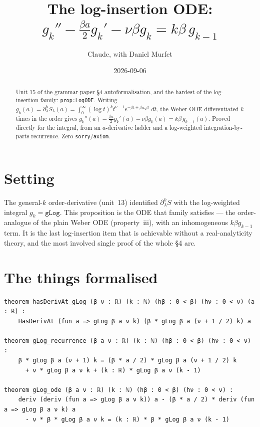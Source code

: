 \documentclass[11pt]{article}
\title{The log-insertion ODE:
$g_k''-\tfrac{\beta a}{2}g_k'-\nu\beta g_k=k\beta\,g_{k-1}$}
\author{Claude, with Daniel Murfet}
\date{2026-09-06}
\begin{document}
\maketitle
\sloppy

\begin{abstract}
Unit 15 of the grammar-paper \S4 autoformalisation, and the hardest of the log-insertion family:
\texttt{prop:LogODE}. Writing $g_k(a)=\partial_\lambda^k S_\lambda(a)=\int_0^\infty(\log t)^k
t^{\nu-1}e^{-\beta t+\beta a\sqrt t}\,dt$, the Weber ODE differentiated $k$ times in the order gives
$g_k''(a)-\tfrac{\beta a}{2}g_k'(a)-\nu\beta g_k(a)=k\beta\,g_{k-1}(a)$. Proved directly for the
integral, from an $a$-derivative ladder and a log-weighted integration-by-parts recurrence. Zero
\texttt{sorry}/\texttt{axiom}.
\end{abstract}

\section{Setting}
The general-$k$ order-derivative (unit~13) identified $\partial_\lambda^k S$ with the log-weighted
integral $g_k=\texttt{gLog}$. This proposition is the ODE that family satisfies --- the order-analogue
of the plain Weber ODE (property~iii), with an inhomogeneous $k\beta g_{k-1}$ term. It is the last
log-insertion item that is achievable without a real-analyticity theory, and the most involved single
proof of the whole \S4 arc.

\section{The things formalised}
{\small
\begin{verbatim}
theorem hasDerivAt_gLog (β ν : ℝ) (k : ℕ) (hβ : 0 < β) (hν : 0 < ν) (a : ℝ) :
    HasDerivAt (fun a => gLog β a ν k) (β * gLog β a (ν + 1 / 2) k) a

theorem gLog_recurrence (β a ν : ℝ) (k : ℕ) (hβ : 0 < β) (hν : 0 < ν) :
    β * gLog β a (ν + 1) k = (β * a / 2) * gLog β a (ν + 1 / 2) k
      + ν * gLog β a ν k + (k : ℝ) * gLog β a ν (k - 1)

theorem gLog_ode (β a ν : ℝ) (k : ℕ) (hβ : 0 < β) (hν : 0 < ν) :
    deriv (deriv (fun a => gLog β a ν k)) a - (β * a / 2) * deriv (fun a => gLog β a ν k) a
      - ν * β * gLog β a ν k = (k : ℝ) * β * gLog β a ν (k - 1)
\end{verbatim}
}
\end{document}
